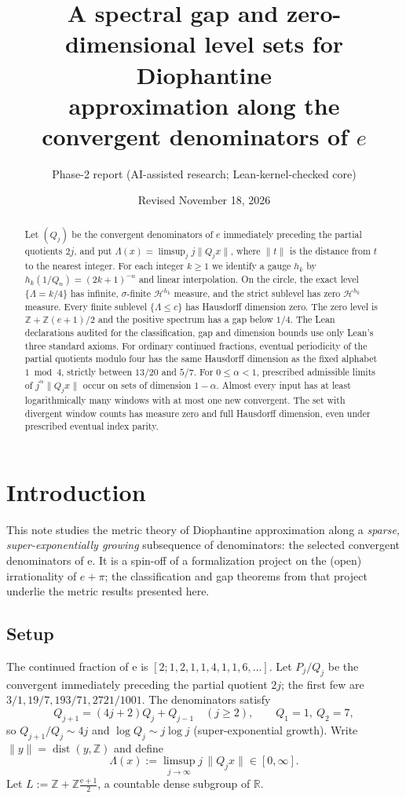 \documentclass[11pt]{article}
\title{A spectral gap and zero-dimensional level sets for Diophantine\\
approximation along the convergent denominators of \texorpdfstring{$e$}{e}}
\author{Phase-2 report (AI-assisted research; Lean-kernel-checked core)}
\date{Revised November 18, 2026}
\theoremstyle{definition}
\theoremstyle{remark}
\newcommand{\R}{\mathbb{R}}
\newcommand{\Z}{\mathbb{Z}}
\newcommand{\ee}{\mathrm{e}}
\newcommand{\dist}{\operatorname{dist}}
\newcommand{\Lam}{\Lambda}
\begin{document}
\maketitle

\begin{abstract}
Let $(Q_j)$ be the convergent denominators of $e$ immediately preceding
the partial quotients $2j$, and put $\Lambda(x)=\limsup_j j\|Q_jx\|$,
where $\|t\|$ is the distance from $t$ to the nearest integer.
For each integer $k\ge1$ we identify a gauge $h_k$ by
$h_k(1/Q_n)=(2k+1)^{-n}$ and linear interpolation. On the circle,
the exact level $\{\Lambda=k/4\}$ has infinite, $\sigma$-finite
$\mathcal H^{h_k}$ measure, and the strict sublevel has zero
$\mathcal H^{h_k}$ measure. Every finite sublevel
$\{\Lambda\le c\}$ has Hausdorff dimension zero. The zero level is
$\mathbb Z+\mathbb Z(e+1)/2$ and the positive spectrum has a gap
below $1/4$. The Lean declarations audited for the classification,
gap and dimension bounds use only Lean's three standard axioms.
For ordinary continued fractions, eventual periodicity of the
partial quotients modulo four has the same Hausdorff dimension
as the fixed alphabet $1\bmod 4$, strictly between $13/20$ and $5/7$.
For $0\le\alpha<1$, prescribed admissible limits of
$j^\alpha\|Q_jx\|$ occur on sets of dimension $1-\alpha$.
Almost every input has at least logarithmically many windows with
at most one new convergent.
The set with divergent window counts has measure zero and full
Hausdorff dimension, even under prescribed eventual index parity.
\end{abstract}

\section{Introduction}

This note studies the metric theory of Diophantine approximation along a
\emph{sparse, super-exponentially growing} subsequence of denominators: the
selected convergent denominators of $\ee$. It is a spin-off of a formalization
project on the (open) irrationality of $e+\pi$; the classification and gap
theorems from that project underlie the metric results presented here.

\subsection{Setup}

The continued fraction of $\ee$ is $[2;1,2,1,1,4,1,1,6,\dots]$. Let $P_j/Q_j$
be the convergent immediately preceding the partial quotient $2j$; the first
few are $3/1,19/7,193/71,2721/1001$. The denominators satisfy
\begin{equation}\label{eq:rec}
Q_{j+1}=(4j+2)Q_j+Q_{j-1}\quad(j\ge2),\qquad Q_1=1,\ Q_2=7,
\end{equation}
so $Q_{j+1}/Q_j\sim 4j$ and $\log Q_j\sim j\log j$ (super-exponential growth).
Write $\|y\|=\dist(y,\Z)$ and define
\[
\Lam(x):=\limsup_{j\to\infty} j\,\|Q_j x\|\in[0,\infty].
\]
Let $L:=\Z+\Z\frac{\ee+1}{2}$, a countable dense subgroup of $\R$.
\end{document}
